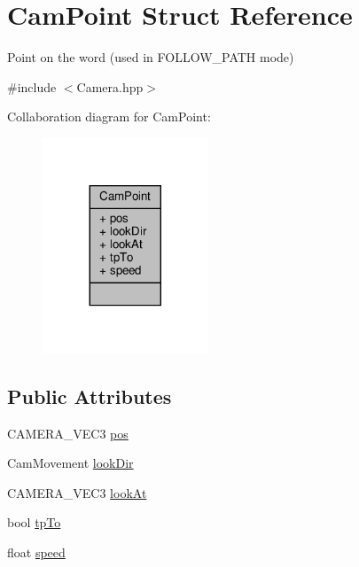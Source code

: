 \hypertarget{struct_cam_point}{}\section{Cam\+Point Struct Reference}
\label{struct_cam_point}


Point on the word (used in F\+O\+L\+L\+O\+W\+\_\+\+P\+A\+TH mode)  




{\ttfamily \#include $<$Camera.\+hpp$>$}



Collaboration diagram for Cam\+Point\+:
\nopagebreak
\begin{figure}[H]
\begin{center}
\leavevmode
\includegraphics[width=140pt]{struct_cam_point__coll__graph}
\end{center}
\end{figure}
\subsection*{Public Attributes}
\begin{DoxyCompactItemize}
\item 
C\+A\+M\+E\+R\+A\+\_\+\+V\+E\+C3 \hyperlink{struct_cam_point_a838dcf4ad928c2537c504819558b48cf}{pos}
\item 
Cam\+Movement \hyperlink{struct_cam_point_a9adfb35cbba2a45bc92c59af6ef0b829}{look\+Dir}
\item 
C\+A\+M\+E\+R\+A\+\_\+\+V\+E\+C3 \hyperlink{struct_cam_point_a5f58524872784b39ec00277775166679}{look\+At}
\item 
bool \hyperlink{struct_cam_point_a1a53e869d446d6335370ff477f3776ae}{tp\+To}
\item 
float \hyperlink{struct_cam_point_af76796aa17e711865e47e737693f6fc5}{speed}
\end{DoxyCompactItemize}



